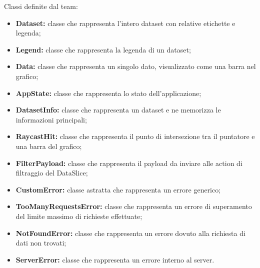 Classi definite dal team:
\begin{itemize}
      \item \textbf{Dataset:} classe che rappresenta l'intero dataset con relative etichette e legenda;
      \item \textbf{Legend:} classe che rappresenta la legenda di un dataset;
      \item \textbf{Data:} classe che rappresenta un singolo dato, visualizzato come una barra nel grafico;
      \item \textbf{AppState:} classe che rappresenta lo stato dell'applicazione;
      \item \textbf{DatasetInfo:} classe che rappresenta un dataset e ne memorizza le informazioni principali;
      \item \textbf{RaycastHit:} classe che rappresenta il punto di intersezione tra il puntatore e una barra del grafico;
      \item \textbf{FilterPayload:} classe che rappresenta il payload da inviare alle action di filtraggio del DataSlice;
      \item \textbf{CustomError:} classe astratta che rappresenta un errore generico;
      \item \textbf{TooManyRequestsError:} classe che rappresenta un errore di superamento del limite massimo di richieste effettuate;
      \item \textbf{NotFoundError:} classe che rappresenta un errore dovuto alla richiesta di dati non trovati;
      \item \textbf{ServerError:} classe che rappresenta un errore interno al server.
\end{itemize}
